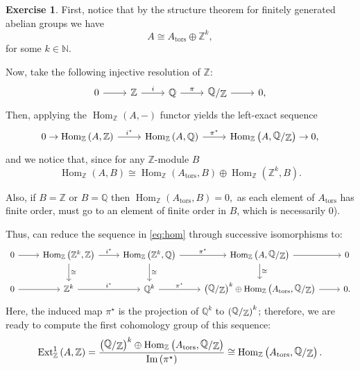 \documentclass[a4paper]{article}
\newcommand{\Q}{\mathbb{Q}}
\newcommand{\N}{\mathbb{N}}
\newcommand{\Z}{\mathbb{Z}}
\newcommand{\Hom}{\operatorname{Hom}}
\newcommand{\Ext}{\operatorname{Ext}}
\newcommand{\sfrac}[2]{
    \raisebox{+0.3ex}{$#1$}
    /
    \raisebox{-0.3ex}{$#2$}
}
\newcommand{\ssfrac}[2]{
    \raisebox{+0.3ex}{\scalebox{0.9}{$#1$}}
    /
    \raisebox{-0.3ex}{\scalebox{0.9}{$#2$}}
}
\renewcommand{\Im}{\operatorname{Im}}
\theoremstyle{definition}
\theoremstyle{definition}
\theoremstyle{remark}
\theoremstyle{definition}
\newtheorem{exercise}{Exercise}[section]
\begin{document}
\begin{exercise}
First, notice that by the structure theorem for finitely generated abelian groups we have
$$ A\cong A_\text{tors}\oplus\Z^k ,$$
for some $k\in \N$.

Now, take the following injective resolution of $\Z$:
\begin{equation*}
\begin{tikzcd}
	0 \rar & {\Z} \rar["i"] & {\Q} \rar["\pi"] & {\sfrac{\Q}{\Z}} \rar & 0,
\end{tikzcd}
\end{equation*}
Then, applying the $\Hom_{\Z}\left( A,- \right) $ functor yields the left-exact sequence
\begin{equation}\label{eq:hom}
\begin{tikzcd}
	0 \rightarrow &[-3em] \Hom_{\Z}{\left(A,\Z\right)} \rar["i^\star"] & \Hom_{\Z}{\left(A,\Q\right)} \rar["\pi^\star"] &
	\Hom_{\Z}{\left(A,{\sfrac{\Q}{\Z}}\right)} \rightarrow &[-3em] 0,
\end{tikzcd}
\end{equation}
and we notice that, since for any $\Z$-module $B$ $$\Hom_{\Z}\left( A,B \right) \cong\Hom_{\Z}\left( A_\text{tors},B \right)\oplus\Hom_{\Z}\left( \Z^k,B \right).$$

Also, if $B=\Z$ or $B=\Q$ then  $\Hom_{\Z}\left( A_\text{tors},B \right)=0,$ as each element of $A_\text{tors}$ has finite order, must go to an element of finite order
in $B$, which is necessarily $0$).

Thus, can reduce the sequence in \eqref{eq:hom} through successive isomorphisms to:
\begin{equation*}
\begin{tikzcd}
	0 \rar & \Hom_{\Z}{\left(\Z^k,\Z\right)} \rar["i^\star"]\ar[d,"\cong"]&\Hom_{\Z}{\left(\Z^k,\Q\right)} \rar["\pi^\star"]\ar[d,"\cong"] &
	\Hom_{\Z}{\left(A,{\sfrac{\Q}{\Z}}\right)} \rar\ar[d,"\cong"] & 0\\
	0 \rar & {\Z^k} \rar["i^\star"] & {\Q^k} \rar["\pi^\star"] & {\left(\sfrac{\Q}{\Z}\right)^k\oplus\Hom_{\Z}\left( A_\text{tors},\sfrac{\Q}{\Z} \right)} \rar & 0.
\end{tikzcd}
\end{equation*}
Here, the induced map $\pi^\star$ is the projection of $\Q^k$ to $\left(\ssfrac{\Q}{\Z}\right)^k$; therefore, we are ready to compute the first cohomology group of this sequence:
$$\Ext_{\Z}^1\left( A,\Z \right)=\frac{\left(\sfrac{\Q}{\Z}\right)^k\oplus\Hom_{\Z}\left( A_\text{tors},\sfrac{\Q}{\Z} \right)}{\Im\left( \pi^\star \right) }\cong\Hom_{\Z}\left( A_\text{tors},\sfrac{\Q}{\Z} \right).$$
\end{exercise}
\end{document}
